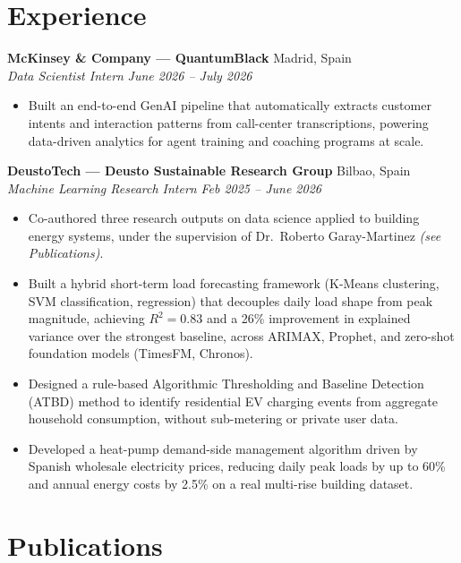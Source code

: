\documentclass[10pt,a4paper]{article}
\newcommand{\cvheader}[2]{\textbf{#1} \hfill #2\\}
\newcommand{\cvsubheader}[2]{\textit{#1} \hfill \textit{#2}\\[-10pt]}
\begin{document}
\section{Experience}

\cvheader{McKinsey \& Company --- QuantumBlack}{Madrid, Spain}
\cvsubheader{Data Scientist Intern}{June 2026 -- July 2026}
\begin{itemize}
    \item Built an end-to-end GenAI pipeline that automatically extracts customer intents and interaction patterns from call-center transcriptions, powering data-driven analytics for agent training and coaching programs at scale.
\end{itemize}

\vspace{2pt}
\cvheader{DeustoTech --- Deusto Sustainable Research Group}{Bilbao, Spain}
\cvsubheader{Machine Learning Research Intern}{Feb 2025 -- June 2026}
\begin{itemize}
    \item Co-authored three research outputs on data science applied to building energy systems, under the supervision of Dr.\ Roberto Garay-Martinez \textit{(see Publications)}.
    \item Built a hybrid short-term load forecasting framework (K-Means clustering, SVM classification, regression) that decouples daily load shape from peak magnitude, achieving $R^2=0.83$ and a 26\% improvement in explained variance over the strongest baseline, across ARIMAX, Prophet, and zero-shot foundation models (TimesFM, Chronos).
    \item Designed a rule-based Algorithmic Thresholding and Baseline Detection (ATBD) method to identify residential EV charging events from aggregate household consumption, without sub-metering or private user data.
    \item Developed a heat-pump demand-side management algorithm driven by Spanish wholesale electricity prices, reducing daily peak loads by up to 60\% and annual energy costs by 2.5\% on a real multi-rise building dataset.
\end{itemize}

\section{Publications}
\end{document}
